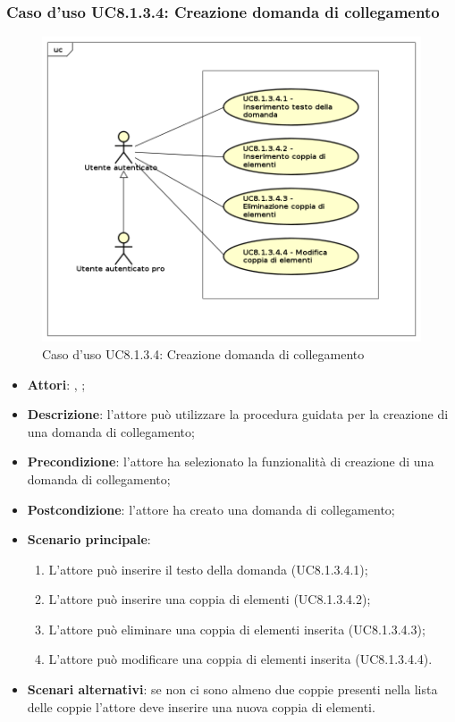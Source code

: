 \subsubsection{Caso d'uso UC8.1.3.4: Creazione domanda di collegamento}
\label{UC8.1.3.4}
\begin{figure}[h]
	\centering
\includegraphics[scale=0.5,keepaspectratio]{UML/UC8_1_3_4.png}
	\caption{Caso d'uso UC8.1.3.4: Creazione domanda di collegamento}
\end{figure}
\FloatBarrier
\begin{itemize}
	\item \textbf{Attori}: \uau, \uaupro;
	\item \textbf{Descrizione}: l'attore può utilizzare la procedura guidata per la creazione di una domanda di collegamento; 
	\item \textbf{Precondizione}: l'attore ha selezionato la funzionalità di creazione di una domanda di collegamento;
	\item \textbf{Postcondizione}: l'attore ha creato una domanda di collegamento;
	\item \textbf{Scenario principale}: 
		\begin{enumerate}
			\item L'attore può inserire il testo della domanda (UC8.1.3.4.1);
			\item L'attore può inserire una coppia di elementi (UC8.1.3.4.2);
			\item L'attore può eliminare una coppia di elementi inserita (UC8.1.3.4.3);
			\item L'attore può modificare una coppia di elementi inserita (UC8.1.3.4.4).
		\end{enumerate}
	\item \textbf{Scenari alternativi}: se non ci sono almeno due coppie presenti nella lista delle coppie l'attore deve inserire una nuova coppia di elementi.
\end{itemize}

